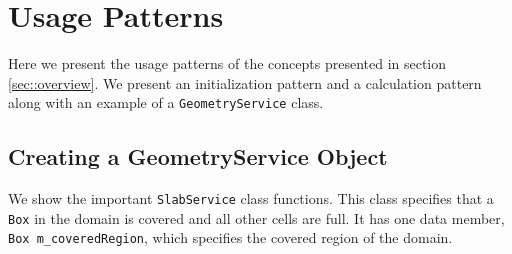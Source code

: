 \section{Usage Patterns}

Here we present the usage patterns of the concepts 
presented in section \ref{sec::overview}.  We present
an initialization pattern and a calculation pattern
along with an example of a {\tt GeometryService} class.

\subsection{Creating a GeometryService Object}
\label{sec::slab}

We show the important {\tt SlabService} class functions.
This class specifies that a {\tt Box} in the domain
is covered and all other cells are full. It has
one data member, {\verb/Box m_coveredRegion/}, which 
specifies the covered region of the domain.
